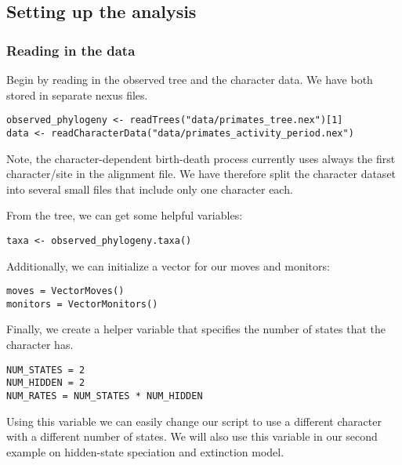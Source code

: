 \subsection{Setting up the analysis}

\subsubsection{Reading in the data}

Begin by reading in the observed tree and the character data.
We have both stored in separate nexus files.
{\tt \begin{snugshade*}
\begin{lstlisting}
observed_phylogeny <- readTrees("data/primates_tree.nex")[1]
data <- readCharacterData("data/primates_activity_period.nex")
\end{lstlisting}
\end{snugshade*}}
Note, the character-dependent birth-death process currently uses always the first character/site in the alignment file.
We have therefore split the character dataset into several small files that include only one character each.

From the tree, we can get some helpful variables:
{\tt \begin{snugshade*}
\begin{lstlisting}
taxa <- observed_phylogeny.taxa()
\end{lstlisting}
\end{snugshade*}}

Additionally, we can initialize a vector for our moves and monitors:
{\tt \begin{snugshade*}
\begin{lstlisting}
moves = VectorMoves()
monitors = VectorMonitors()
\end{lstlisting}
\end{snugshade*}}

Finally, we create a helper variable that specifies the number of states that the character has.
{\tt \begin{snugshade*}
\begin{lstlisting}
NUM_STATES = 2
NUM_HIDDEN = 2
NUM_RATES = NUM_STATES * NUM_HIDDEN
\end{lstlisting}
\end{snugshade*}}
Using this variable we can easily change our script to use a different character with a different number of states.
We will also use this variable in our second example on hidden-state speciation and extinction model. 


